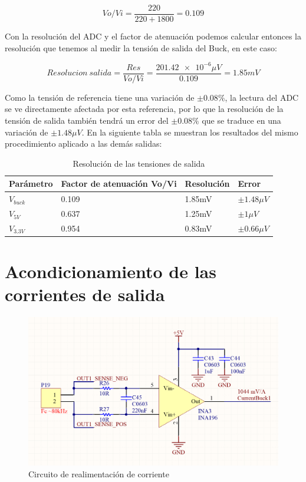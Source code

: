 \documentclass[12pt]{report}
\begin{document}
\begin{equation}
	Vo/Vi = \frac{220}{220 + 1800} = 0.109
\end{equation}

Con la resolución del ADC y el factor de atenuación podemos calcular entonces la resolución que tenemos al medir la tensión de salida del Buck, en este caso:

\begin{equation}
	Resolucion \ salida = \frac{Res}{Vo/Vi} = \frac{\num{201.42e-6} \mu V}{0.109} = 1.85 mV
\end{equation}

Como la tensión de referencia tiene una variación de $\pm0.08\%$, la lectura del ADC se ve directamente afectada por esta referencia, por lo que la resolución de la tensión de salida también tendrá un error del $\pm0.08\%$ que se traduce en una variación de $\pm1.48 \mu V$. En la siguiente tabla se muestran los resultados del mismo procedimiento aplicado a las demás salidas:

\begin{table}[H]
	\centering
	\begin{tabular}{M{2cm}M{5cm}M{3cm}M{3cm}} \toprule
		Parámetro & Factor de atenuación Vo/Vi & Resolución & Error 
		\\ \midrule
		$V_{buck}$ & 0.109 & 1.85mV & $\pm1.48 \mu V$ \\
		$V_{5V}$ & 0.637 & 1.25mV & $\pm1 \mu V$ \\
		$V_{3.3V}$ & 0.954 & 0.83mV & $\pm0.66 \mu V$ \\
		\bottomrule
	\end{tabular}
	\caption{Resolución de las tensiones de salida}
\end{table}

\section{Acondicionamiento de las corrientes de salida}

\begin{figure}[H]
	\centering
	\includegraphics[width=\textwidth,height=\textheight,keepaspectratio]{current_feedback}
	\caption{Circuito de realimentación de corriente}
\end{figure}
\end{document}
